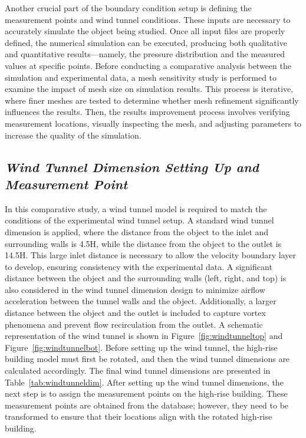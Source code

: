 \documentclass[12pt,a4paper]{cibb}
\begin{document}
Another crucial part of the boundary condition setup is defining the measurement points and wind tunnel conditions. These inputs are necessary to accurately simulate the object being studied. Once all input files are properly defined, the numerical simulation can be executed, producing both qualitative and quantitative results—namely, the pressure distribution and the measured values at specific points.
Before conducting a comparative analysis between the simulation and experimental data, a mesh sensitivity study is performed to examine the impact of mesh size on simulation results. This process is iterative, where finer meshes are tested to determine whether mesh refinement significantly influences the results. Then, the results improvement process involves verifying measurement locations, visually inspecting the mesh, and adjusting parameters to increase the quality of the simulation. 



\subsection{\bf \it Wind Tunnel Dimension Setting Up and Measurement Point}
In this comparative study, a wind tunnel model is required to match the conditions of the experimental wind tunnel setup. A standard wind tunnel dimension is applied, where the distance from the object to the inlet and surrounding walls is 4.5H, while the distance from the object to the outlet is 14.5H. This large inlet distance is necessary to allow the velocity boundary layer to develop, ensuring consistency with the experimental data.
A significant distance between the object and the surrounding walls (left, right, and top) is also considered in the wind tunnel dimension design to minimize airflow acceleration between the tunnel walls and the object. Additionally, a larger distance between the object and the outlet is included to capture vortex phenomena and prevent flow recirculation from the outlet.
A schematic representation of the wind tunnel is shown in Figure~\ref{fig:windtunneltop} and Figure~\ref{fig:windtunnelbot}. Before setting up the wind tunnel, the high-rise building model must first be rotated, and then the wind tunnel dimensions are calculated accordingly. The final wind tunnel dimensions are presented in Table~\ref{tab:windtunneldim}. After setting up the wind tunnel dimensions, the next step is to assign the measurement points on the high-rise building. These measurement points are obtained from the database; however, they need to be transformed to ensure that their locations align with the rotated high-rise building.  
\end{document}
